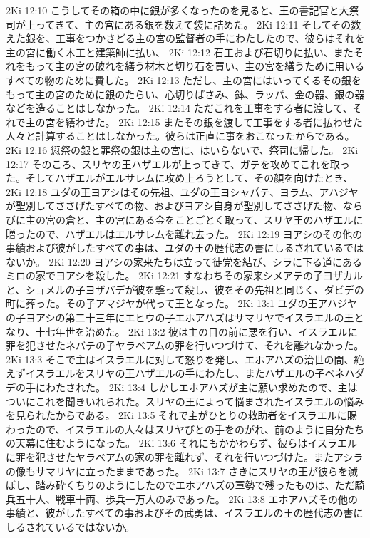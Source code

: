 2Ki 12:10  こうしてその箱の中に銀が多くなったのを見ると、王の書記官と大祭司が上ってきて、主の宮にある銀を数えて袋に詰めた。
2Ki 12:11  そしてその数えた銀を、工事をつかさどる主の宮の監督者の手にわたしたので、彼らはそれを主の宮に働く木工と建築師に払い、
2Ki 12:12  石工および石切りに払い、またそれをもって主の宮の破れを繕う材木と切り石を買い、主の宮を繕うために用いるすべての物のために費した。
2Ki 12:13  ただし、主の宮にはいってくるその銀をもって主の宮のために銀のたらい、心切りばさみ、鉢、ラッパ、金の器、銀の器などを造ることはしなかった。
2Ki 12:14  ただこれを工事をする者に渡して、それで主の宮を繕わせた。
2Ki 12:15  またその銀を渡して工事をする者に払わせた人々と計算することはしなかった。彼らは正直に事をおこなったからである。
2Ki 12:16  愆祭の銀と罪祭の銀は主の宮に、はいらないで、祭司に帰した。
2Ki 12:17  そのころ、スリヤの王ハザエルが上ってきて、ガテを攻めてこれを取った。そしてハザエルがエルサレムに攻め上ろうとして、その顔を向けたとき、
2Ki 12:18  ユダの王ヨアシはその先祖、ユダの王ヨシャパテ、ヨラム、アハジヤが聖別してささげたすべての物、およびヨアシ自身が聖別してささげた物、ならびに主の宮の倉と、主の宮にある金をことごとく取って、スリヤ王のハザエルに贈ったので、ハザエルはエルサレムを離れ去った。
2Ki 12:19  ヨアシのその他の事績および彼がしたすべての事は、ユダの王の歴代志の書にしるされているではないか。
2Ki 12:20  ヨアシの家来たちは立って徒党を結び、シラに下る道にあるミロの家でヨアシを殺した。
2Ki 12:21  すなわちその家来シメアテの子ヨザカルと、ショメルの子ヨザバデが彼を撃って殺し、彼をその先祖と同じく、ダビデの町に葬った。その子アマジヤが代って王となった。
2Ki 13:1  ユダの王アハジヤの子ヨアシの第二十三年にエヒウの子エホアハズはサマリヤでイスラエルの王となり、十七年世を治めた。
2Ki 13:2  彼は主の目の前に悪を行い、イスラエルに罪を犯させたネバテの子ヤラベアムの罪を行いつづけて、それを離れなかった。
2Ki 13:3  そこで主はイスラエルに対して怒りを発し、エホアハズの治世の間、絶えずイスラエルをスリヤの王ハザエルの手にわたし、またハザエルの子ベネハダデの手にわたされた。
2Ki 13:4  しかしエホアハズが主に願い求めたので、主はついにこれを聞きいれられた。スリヤの王によって悩まされたイスラエルの悩みを見られたからである。
2Ki 13:5  それで主がひとりの救助者をイスラエルに賜わったので、イスラエルの人々はスリヤびとの手をのがれ、前のように自分たちの天幕に住むようになった。
2Ki 13:6  それにもかかわらず、彼らはイスラエルに罪を犯させたヤラベアムの家の罪を離れず、それを行いつづけた。またアシラの像もサマリヤに立ったままであった。
2Ki 13:7  さきにスリヤの王が彼らを滅ぼし、踏み砕くちりのようにしたのでエホアハズの軍勢で残ったものは、ただ騎兵五十人、戦車十両、歩兵一万人のみであった。
2Ki 13:8  エホアハズその他の事績と、彼がしたすべての事およびその武勇は、イスラエルの王の歴代志の書にしるされているではないか。
